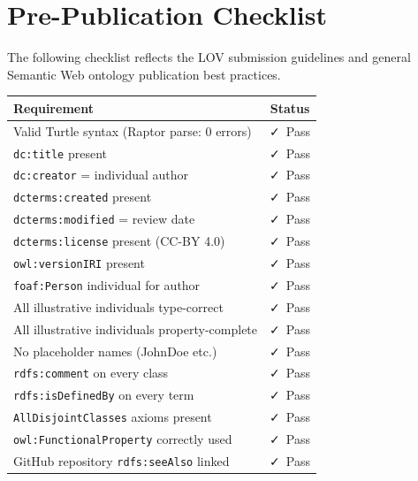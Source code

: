 \documentclass[11pt, a4paper]{article}
\begin{document}
\section{Pre-Publication Checklist}

The following checklist reflects the LOV submission guidelines and general
Semantic Web ontology publication best practices.

\begin{center}
\renewcommand{\arraystretch}{1.3}
\begin{tabular}{@{} l c @{}}
\rowcolor{cair-light}
\textbf{Requirement} & \textbf{Status} \\
\midrule
Valid Turtle syntax (Raptor parse: 0 errors) & \textcolor{severity-minor}{\faCheck\ Pass} \\
\rowcolor{row-alt}
\texttt{dc:title} present                  & \textcolor{severity-minor}{\faCheck\ Pass} \\
\texttt{dc:creator} = individual author    & \textcolor{severity-minor}{\faCheck\ Pass} \\
\rowcolor{row-alt}
\texttt{dcterms:created} present           & \textcolor{severity-minor}{\faCheck\ Pass} \\
\texttt{dcterms:modified} = review date    & \textcolor{severity-minor}{\faCheck\ Pass} \\
\rowcolor{row-alt}
\texttt{dcterms:license} present (CC-BY 4.0) & \textcolor{severity-minor}{\faCheck\ Pass} \\
\texttt{owl:versionIRI} present            & \textcolor{severity-minor}{\faCheck\ Pass} \\
\rowcolor{row-alt}
\texttt{foaf:Person} individual for author & \textcolor{severity-minor}{\faCheck\ Pass} \\
All illustrative individuals type-correct  & \textcolor{severity-minor}{\faCheck\ Pass} \\
\rowcolor{row-alt}
All illustrative individuals property-complete & \textcolor{severity-minor}{\faCheck\ Pass} \\
No placeholder names (JohnDoe etc.)        & \textcolor{severity-minor}{\faCheck\ Pass} \\
\rowcolor{row-alt}
\texttt{rdfs:comment} on every class       & \textcolor{severity-minor}{\faCheck\ Pass} \\
\texttt{rdfs:isDefinedBy} on every term    & \textcolor{severity-minor}{\faCheck\ Pass} \\
\rowcolor{row-alt}
\texttt{AllDisjointClasses} axioms present & \textcolor{severity-minor}{\faCheck\ Pass} \\
\texttt{owl:FunctionalProperty} correctly used & \textcolor{severity-minor}{\faCheck\ Pass} \\
\rowcolor{row-alt}
GitHub repository \texttt{rdfs:seeAlso} linked & \textcolor{severity-minor}{\faCheck\ Pass} \\
\end{tabular}
\end{center}
\end{document}
